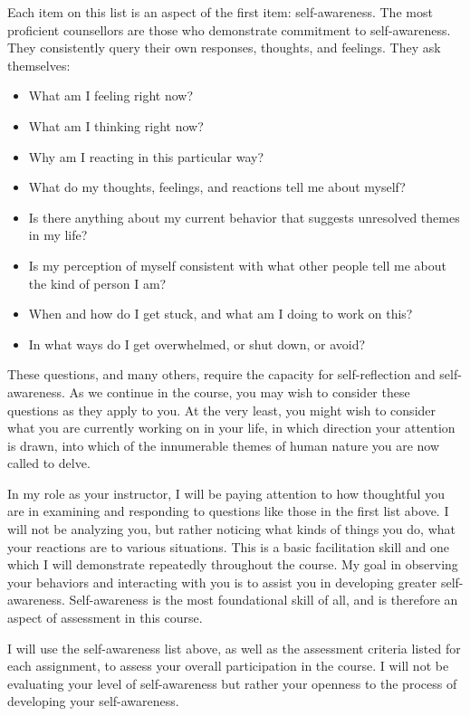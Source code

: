 \documentclass[letterpaper,10pt,headsepline]{scrreprt}
\begin{document}
Each item on this list is an aspect of the first item: self-awareness. The most proficient counsellors are those who demonstrate commitment to self-awareness. They consistently query their own responses, thoughts, and feelings. They ask themselves:

\begin{itemize}
\item What am I feeling right now?
\item What am I thinking right now?
\item Why am I reacting in this particular way?
\item What do my thoughts, feelings, and reactions tell me about myself?
\item Is there anything about my current behavior that suggests unresolved themes in my life?
\item Is my perception of myself consistent with what other people tell me about the kind of person I am?
\item When and how do I get stuck, and what am I doing to work on this?
\item In what ways do I get overwhelmed, or shut down, or avoid?
 
\end{itemize}

These questions, and many others, require the capacity for self-reflection and self-awareness. As we continue in the course, you may wish to consider these questions as they apply to you. At the very least, you might wish to consider what you are currently working on in your life, in which direction your attention is drawn, into which of the innumerable themes of human nature you are now called to delve.

In my role as your instructor, I will be paying attention to how thoughtful you are in examining and responding to questions like those in the first list above. I will not be analyzing you, but rather noticing what kinds of things you do, what your reactions are to various situations. This is a basic facilitation skill and one which I will demonstrate repeatedly throughout the course. My goal in observing your behaviors and interacting with you is to assist you in developing greater self-awareness. Self-awareness is the most foundational skill of all, and is therefore an aspect of assessment in this course.

I will use the self-awareness list above, as well as the assessment criteria listed for each assignment, to assess your overall participation in the course. I will not be evaluating your level of self-awareness but rather your openness to the process of developing your self-awareness.
\end{document}
